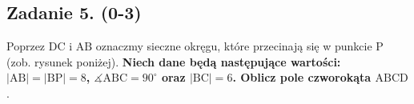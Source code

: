 \subsection*{Zadanie 5. (0-3)} 
Poprzez $\mathrm{DC}$ i $\mathrm{AB}$ oznaczmy sieczne okręgu, które przecinają się w punkcie $\mathrm{P}$ (zob. rysunek poniżej). \textbf{Niech dane będą następujące wartości: $|\mathrm{AB}| = |\mathrm{BP}| = 8$, $\measuredangle \mathrm{ABC} = 90^\circ$ oraz $|\mathrm{BC}| = 6$. Oblicz pole czworokąta $\mathrm{ABCD}$}.
% 	
